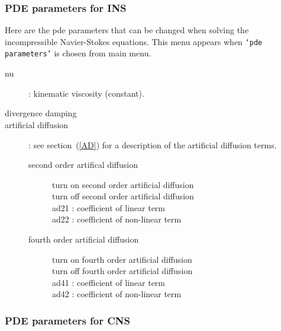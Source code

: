\subsubsection{PDE parameters for INS}\label{sec:pdeParams}
 

 Here are the pde parameters that can be changed when solving the incompressible Navier-Stokes equations.
 This menu appears when {\tt `pde parameters'} is chosen from main menu.
\begin{description}
  \item[nu] : kinematic viscosity (constant).
  \item[divergence damping]
  \item[artificial diffusion] : see section~(\ref{AD}) for a description of the artificial diffusion terms.
    \begin{description}
      \item[second order artifical diffusion]
        \begin{description}
          \item[turn on second order artificial diffusion]
          \item[turn off second order artificial diffusion]
          \item[ad21 : coefficient of linear term]
          \item[ad22 : coefficient of non-linear term]
        \end{description}
      \item[fourth order artificial diffusion]
        \begin{description}
          \item[turn on fourth order artificial diffusion]
          \item[turn off fourth order artificial diffusion]
          \item[ad41 : coefficient of linear term]
          \item[ad42 : coefficient of non-linear term]
        \end{description}
    \end{description}
  \end{description}

\subsubsection{PDE parameters for CNS}\label{sec:cnsPdeParams}
 

